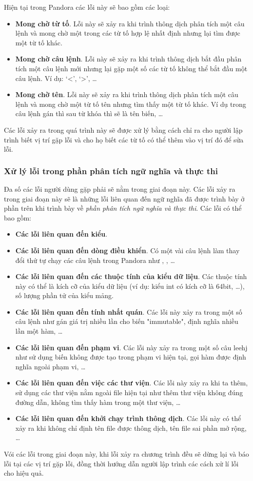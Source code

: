 Hiện tại trong Pandora các lỗi này sẽ bao gồm các loại:
\begin{itemize}
    \item \textbf{Mong chờ từ tố}. Lỗi này sẽ xảy ra khi trình thông dịch phân tích một câu lệnh và mong chờ một trong các từ tố hợp lệ nhất định nhưng lại tìm được một từ tố khác.
    \item \textbf{Mong chờ câu lệnh}. Lỗi này sẽ xảy ra khi trình thông dịch bắt đầu phân tích một câu lệnh mới nhưng lại gặp một số các từ tố không thể bắt đầu một câu lệnh. Ví dụ: `<', `>', \dots
    \item \textbf{Mong chờ tên}. Lỗi này sẽ xảy ra khi trình thông dịch phân tích một câu lệnh và mong chờ một từ tố tên nhưng tìm thấy một từ tố khác. Ví dụ trong câu lệnh gán thì sau từ khóa  thì sẽ là tên biến, \dots
\end{itemize}

Các lỗi xảy ra trong quá trình này sẽ được xử lý bằng cách chỉ ra cho người lập trình biết vị trí gặp lỗi và cho họ biết các từ tố có thể thêm vào vị trí đó để sửa lỗi.

\subsubsection{Xử lý lỗi trong phần phân tích ngữ nghĩa và thực thi}
Đa số các lỗi người dùng gặp phải sẽ nằm trong giai đoạn này. Các lỗi xảy ra trong giai đoạn này sẽ là những lỗi liên quan đến ngữ nghĩa đã được trình bày ở phần trên khi trình bày về \textit{phần phân tích ngữ nghĩa và thực thi}. Các lỗi có thể bao gồm:

\begin{itemize}
    \item \textbf{Các lỗi liên quan đến kiểu}.
    \item \textbf{Các lỗi liên quan đến dòng điều khiển}. Có một vài câu lệnh làm thay đổi thứ tự chạy các câu lệnh trong Pandora như , , \dots
    \item \textbf{Các lỗi liên quan đến các thuộc tính của kiểu dữ liệu}. Các thuộc tính này có thể là kích cỡ của kiểu dữ liệu (ví dụ: kiểu int có kích cỡ là 64bit, \dots), số lượng phần tử của kiểu mảng.
    \item \textbf{Các lỗi liên quan đến tính nhất quán}. Các lỗi này xảy ra trong một số câu lệnh như gán giá trị nhiều lần cho biến "immutable", định nghĩa nhiều lần một hàm, \dots
    \item \textbf{Các lỗi liên quan đến phạm vi}. Các lỗi này xảy ra trong một số câu leehj như sử dụng biến không được tạo trong phạm vi hiện tại, gọi hàm được định nghĩa ngoài phạm vi, \dots
    \item \textbf{Các lỗi liên quan đến việc các thư viện}. Các lỗi này xảy ra khi ta thêm, sử dụng các thư viện nằm ngoài file hiện tại như thêm thư viện không đúng đường dẫn, không tìm thấy hàm trong một thư viện, \dots
    \item \textbf{Các lỗi liên quan đến khởi chạy trình thông dịch}. Các lỗi này có thể xảy ra khi không chỉ định tên file được thông dịch, tên file sai phần mở rộng, \dots
\end{itemize}

Vói các lỗi trong giai đoạn này, khi lỗi xảy ra chương trình đều sẽ dừng lại và báo lỗi tại các vị trí gặp lỗi, đồng thời hướng dẫn người lập trình các cách xử lí lỗi cho hiệu quả.
